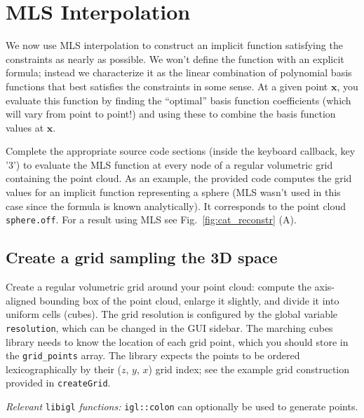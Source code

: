 \documentclass[11pt]{amsart}
\renewcommand{\vec}[1]{\mathbf{#1}}
\def\x{\vec{x}}
\begin{document}
\section{MLS Interpolation}
We now use MLS interpolation to construct an implicit function satisfying the
constraints as nearly as possible. We won't define the function with an explicit
formula; instead we characterize it as the linear combination of polynomial
basis functions that best satisfies the constraints in some sense. At a given
point $\x$, you evaluate this function by finding the ``optimal'' basis function
coefficients (which will vary from point to point!) and using these to combine
the basis function values at $\x$.

Complete the appropriate source code sections (inside the keyboard callback, key
'3') to evaluate the MLS function at every node of a regular volumetric
grid containing the point cloud. As an example, the provided code computes the
grid values for an implicit function representing a sphere (MLS wasn't used in
this case since the formula is known analytically). It corresponds to the point
cloud \texttt{sphere.off}. For a result using MLS see
Fig.~\ref{fig:cat_reconstr} (A).

\subsection{Create a grid sampling the 3D space}
Create a regular volumetric grid around your point cloud: compute the
axis-aligned bounding box of the point cloud, enlarge it slightly, and divide it
into uniform cells (cubes). The grid resolution is configured by
the global variable \texttt{resolution}, which can be changed in the GUI
sidebar. The marching cubes library needs to know the location of each grid
point, which you should store in the \texttt{grid\_points} array. The library
expects the points to be ordered lexicographically by their ($z$, $y$, $x$)
grid index; see the example grid construction provided in \texttt{createGrid}.

\emph{Relevant} \texttt{libigl} \emph{functions: } \texttt{igl::colon} can optionally be used to generate points.
\end{document}
